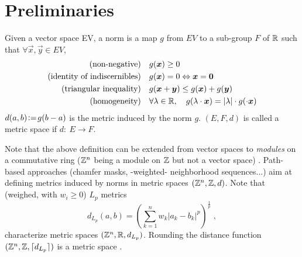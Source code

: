 \documentclass{llncs}
\begin{document}
\section{Preliminaries}
\label{sec:preliminaries}
\begin{definition}
  \label{def:norm}
  Given a vector space EV, a norm is a map $g$ from  $EV$ to a sub-group
  $F$ of ${\mathbb{R}}$ such that $\forall \vec{x},\vec{y}\in EV$,
  \begin{align}
    (\text{non-negative})\quad & g(\vec{x})\geq 0\\
    (\text{identity of indiscernibles}) \quad&  g(\vec{x})= 0
    \Leftrightarrow \vec{x}=\vec{0}\\
    (\text{triangular inequality})\quad &   g(\vec{x}+\vec{y}) \leq
    g(\vec{x}) + g(\vec{y})\\
    (\text{homogeneity})\quad &  \forall \lambda\in\R, \quad
    g(\lambda\cdot\vec{x}) = |\lambda|\cdot g(\cdot\vec{x})
  \end{align}
$d(a,b) \!\mathrel{\mathop:}=\! g(b-a)$ is the metric induced by the
  norm $g$.  $(E, F, d)$ is called a  metric space if $d:~E\rightarrow
  F$.
\end{definition}
Note that the above definition can be extended from vector spaces to
\emph{modules} on a commutative ring (${\mathbb{Z}}^n$ being a module on ${\mathbb{Z}}$
but not a vector space) \cite{Thiel_hdr}. Path-based approaches
(chamfer masks, -weighted- neighborhood sequences...)  aim at defining
metrics induced by norms in metric spaces $({\mathbb{Z}}^n, {\mathbb{Z}} , d)$.  Note that
(weighed, with $w_i\geq 0$) $L_p$ metrics
\begin{equation}
    d_{L_p} (a,b) = \left ( \sum_{k=1}^n w_k|a_k-b_k |^p \right )^{\frac{1}{p}}\;,
  \end{equation}
characterize metric spaces $({\mathbb{Z}}^n, {\mathbb{R}} , d_{L_p})$. Rounding the \sloppy
distance function $({\mathbb{Z}}^n,{\mathbb{Z}}, \lceil d_{L_p}\rceil)$ is a metric
space \cite{klette_book}.
\end{document}
